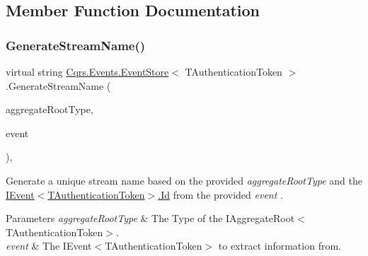 \subsection{Member Function Documentation}
\mbox{\label{classCqrs_1_1Events_1_1EventStore_a03df06d4ce9c6d16201c079f2de0a7f3_a03df06d4ce9c6d16201c079f2de0a7f3}} 
\subsubsection{\texorpdfstring{Generate\+Stream\+Name()}{GenerateStreamName()}\hspace{0.1cm}{\footnotesize\ttfamily [1/2]}}
{\footnotesize\ttfamily virtual string \hyperlink{classCqrs_1_1Events_1_1EventStore}{Cqrs.\+Events.\+Event\+Store}$<$ T\+Authentication\+Token $>$.Generate\+Stream\+Name (\begin{DoxyParamCaption}\item[{Type}]{aggregate\+Root\+Type,  }\item[{\hyperlink{interfaceCqrs_1_1Events_1_1IEvent}{I\+Event}$<$ T\+Authentication\+Token $>$ @}]{event }\end{DoxyParamCaption})\hspace{0.3cm}{\ttfamily [protected]}, {\ttfamily [virtual]}}



Generate a unique stream name based on the provided {\itshape aggregate\+Root\+Type}  and the \hyperlink{interfaceCqrs_1_1Events_1_1IEvent_a2974e13d307c62c5cc438d668ff1783b_a2974e13d307c62c5cc438d668ff1783b}{I\+Event$<$\+T\+Authentication\+Token$>$.\+Id} from the provided {\itshape event} . 


\begin{DoxyParams}{Parameters}
{\em aggregate\+Root\+Type} & The Type of the I\+Aggregate\+Root$<$\+T\+Authentication\+Token$>$.\\
\hline
{\em event} & The I\+Event$<$\+T\+Authentication\+Token$>$ to extract information from.\\
\hline
\end{DoxyParams}
\mbox{\label{classCqrs_1_1Events_1_1EventStore_aba61739e47fdd0f7fce656f896cbe908_aba61739e47fdd0f7fce656f896cbe908}} 
